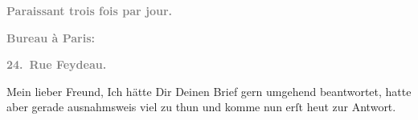 \pstart
           \begin{otherlanguage}{french}\textcolor{gray}{\textbf{\textbf{Paraissant trois fois par jour.}}}\end{otherlanguage}\pend
           
\pstart
           \begin{otherlanguage}{french}\textcolor{gray}{\textbf{\textbf{Bureau à Paris:}}}\end{otherlanguage}\pend
           
\pstart
           \begin{otherlanguage}{french}\textcolor{gray}{\textbf{\textbf{24. Rue Feydeau.}}}\end{otherlanguage}\pend
           
\pstart\center{}Mein lieber Freund,\pend\vspace{0.5em}
\pstart
           Ich hätte Dir Deinen Brief gern umgehend beantwortet, hatte aber gerade ausnahmsweis
               viel zu thun und komme nun erſt heut zur Antwort.\pend
           
